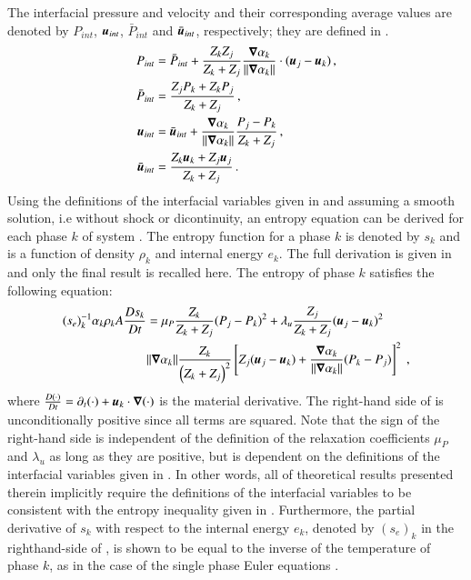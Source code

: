 \documentclass[preprint,10pt]{elsarticle}
\begin{document}
The interfacial pressure and velocity and their corresponding average values are denoted by $P_{int}$, $\boldsymbol u_{int}$, 
$\bar{P}_{int}$ and $\bar{\boldsymbol u}_{int}$, respectively; they are defined in .
%
\begin{subequations}
\label{eq:int_variables_def}
\begin{align}
  \label{E-R:83}
  P_{int} &= \bar{P}_{int} + \frac{Z_{k}Z_{j}}{Z_{k}+Z_{j}} \frac{\boldsymbol\nabla \alpha_{k}}{|| \boldsymbol\nabla \alpha_{k} ||} \cdot (\boldsymbol u_{j}-\boldsymbol u_{k}) \,,
  \\
  \bar{P}_{int} &= \frac{Z_{j}P_{k}+Z_{k}P_{j}}{Z_{k}+Z_{j}} \,,
 \\
  \label{E-R:84}
  \boldsymbol u_{int} &= \bar{\boldsymbol u}_{int} +  \frac{\boldsymbol\nabla \alpha_{k}}{|| \boldsymbol\nabla \alpha_{k} ||} \frac{P_{j}-P_{k}}{Z_{k}+Z_{j}} \,,
  \\
  \bar{\boldsymbol u}_{int} &= \frac{Z_{k} \boldsymbol u_{k}+Z_{j}\boldsymbol u_{j}}{Z_{k}+Z_{j}} \,.
\end{align}
\end{subequations}
%
Using the definitions of the interfacial variables given in  and assuming a smooth solution, i.e without shock or dicontinuity, an entropy equation can be 
derived for each phase $k$ of system . %
The entropy function for a phase $k$ is denoted by $s_k$ and is a function of 
density $\rho_k$ and internal energy $e_k$. The full derivation is given in \cite{Marco_paper_sem} and only the final result is recalled here. 
The entropy of phase $k$ satisfies the following equation:
%
\begin{align} \label{eq:ent-eqn-7-eqn}
(s_{e})_k^{-1} \alpha_k \rho_k A \frac{Ds_k}{Dt} &= \mu_P \frac{Z_k}{Z_k+Z_j} (P_j - P_k)^2 + \lambda_u \frac{Z_j}{Z_k+Z_j} (\boldsymbol u_j -\boldsymbol u_k)^2 
\nonumber
\\
& \| \boldsymbol\nabla \alpha_k \| \frac{Z_k}{\left( Z_k+Z_j \right)^2} \left[ Z_j (\boldsymbol u_j-\boldsymbol u_k)+\frac{\boldsymbol\nabla \alpha_k}{\| \boldsymbol\nabla \alpha_k \|}(P_k-P_j)\right]^2 \ ,
\end{align}
%
where $\frac{D(\cdot) }{Dt} = \partial_t (\cdot) + \boldsymbol u_k \cdot \boldsymbol\nabla (\cdot)$ is the material derivative.
The right-hand side of  is unconditionally positive since all terms are squared. Note that the sign of the right-hand side is independent of 
the definition of the 
relaxation coefficients $\mu_P$ and $\lambda_u$ as long as they are positive, but is dependent on the definitions of the interfacial variables given in . In other words, all of 
theoretical results presented therein implicitly require the definitions of the interfacial variables to be consistent with the entropy inequality given in . Furthermore, 
the partial derivative of $s_k$ with respect to the internal energy $e_k$, denoted by $(s_e)_k$ in the righthand-side of , is shown to be equal to the inverse of the temperature 
of phase $k$, as in the case of the single phase Euler equations \cite{GuermondSIAM2014, DelchiniCompFluid2014-euler, Marco_dissertation}. 
\end{document}
